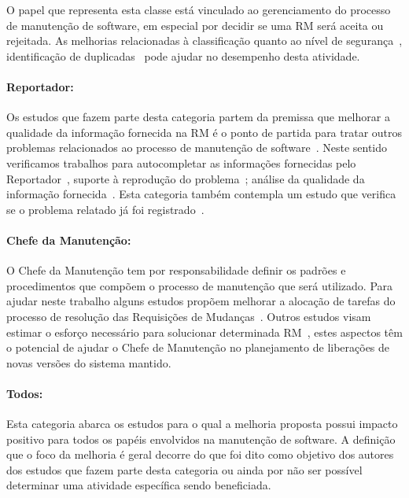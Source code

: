 O papel que representa esta classe está vinculado ao gerenciamento do processo
de manutenção de software, em especial por decidir se uma RM será aceita ou
rejeitada. As melhorias relacionadas à classificação quanto ao
nível de segurança~\cite{gegick2010identifying, zhang2011bug,
    ValdiviaGarcia:2014:CPB:2597073.2597099}, identificação de
duplicadas~\cite{hindle2016contextual, sun2010discriminative,
    alipour2013contextual, banerjee2012automated} pode ajudar no desempenho
desta atividade.

\paragraph{Reportador:} Os estudos que fazem parte desta categoria  partem da
premissa que melhorar a qualidade da informação fornecida na RM é o ponto de
partida para tratar outros problemas relacionados ao processo de manutenção de
software~\cite{moran2015auto, Moran:2015:EAA:2786805.2807557, Bettenburg2008a}.
Neste sentido verificamos trabalhos para autocompletar as informações fornecidas
pelo Reportador~\cite{moran2015auto}, suporte à reprodução do
problema~\cite{Moran:2015:EAA:2786805.2807557}; análise da qualidade da
informação fornecida~\cite{Bettenburg2008a, Tu:2014:MQI:2677832.2677844}. Esta
categoria também contempla um estudo que verifica se o problema relatado já foi
registrado~\cite{Thung2014}.

\paragraph{Chefe da Manutenção:}

O Chefe da Manutenção tem por responsabilidade definir os padrões e
procedimentos que compõem o processo de manutenção que será utilizado. Para
ajudar neste trabalho alguns estudos propõem melhorar a alocação de tarefas do
processo de resolução das Requisições de Mudanças~\cite{netto2010automated}.
Outros estudos visam estimar o esforço necessário para solucionar determinada
RM~\cite{Vijayakumar2014, Nagwani2010}, estes aspectos têm o potencial de ajudar
o Chefe de Manutenção no planejamento de liberações de novas versões do sistema
mantido.

\paragraph{Todos:}

Esta categoria abarca os estudos para o qual a melhoria proposta possui impacto
positivo para todos os papéis envolvidos na manutenção de software. A definição
que o foco da melhoria é geral decorre do que foi dito como objetivo dos autores
dos estudos que fazem parte desta categoria ou ainda por não ser possível
determinar uma atividade específica sendo beneficiada.


